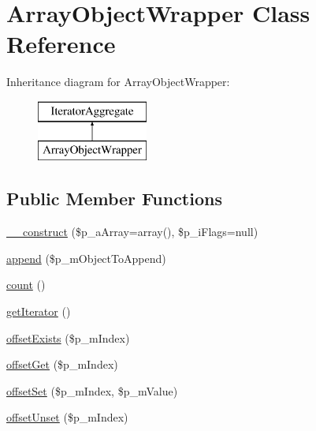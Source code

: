 \hypertarget{class_array_object_wrapper}{\section{Array\-Object\-Wrapper Class Reference}
\label{class_array_object_wrapper}
}
Inheritance diagram for Array\-Object\-Wrapper\-:\begin{figure}[H]
\begin{center}
\leavevmode
\includegraphics[height=2.000000cm]{class_array_object_wrapper}
\end{center}
\end{figure}
\subsection*{Public Member Functions}
\begin{DoxyCompactItemize}
\item 
\hyperlink{class_array_object_wrapper_a669fafc99ae523832111df9ff419c26f}{\-\_\-\-\_\-construct} (\$p\-\_\-a\-Array=array(), \$p\-\_\-i\-Flags=null)
\item 
\hyperlink{class_array_object_wrapper_a5b929cc9927db3604334c4440ec000a4}{append} (\$p\-\_\-m\-Object\-To\-Append)
\item 
\hyperlink{class_array_object_wrapper_ac751e87b3d4c4bf2feb03bee8b092755}{count} ()
\item 
\hyperlink{class_array_object_wrapper_a7a9f937c2958e6f4dd7b030f86fb70b7}{get\-Iterator} ()
\item 
\hyperlink{class_array_object_wrapper_a0d140ee670ddd77874232f083bef932d}{offset\-Exists} (\$p\-\_\-m\-Index)
\item 
\hyperlink{class_array_object_wrapper_aa160b823e136d400f9ffd480f25b5f71}{offset\-Get} (\$p\-\_\-m\-Index)
\item 
\hyperlink{class_array_object_wrapper_a4930cef3acef8460f7f0517791f188b1}{offset\-Set} (\$p\-\_\-m\-Index, \$p\-\_\-m\-Value)
\item 
\hyperlink{class_array_object_wrapper_a030879cbf382538eb70f3a2db8a0a15c}{offset\-Unset} (\$p\-\_\-m\-Index)
\end{DoxyCompactItemize}


